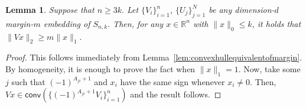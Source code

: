 \documentclass[preprint]{article}
\newtheorem{lemma}{Lemma}[]
\newcommand{\ksparsen}{S_{n,k}}
\newcommand{\conv}{\mathsf{conv}}
\begin{document}
\begin{lemma}\label{lem:reductiontosparselowerbound}
    Suppose that $n \ge 3k.$ Let $\{V_i\}_{i =1}^n$, $\{U_j\}_{j = 1}^N$ be any dimension-$d$ margin-$m$ embedding of $\ksparsen.$ Then, for any $x \in \mathbb{R}^n$ with $\|x\|_0 \leq k$, it holds that 
    $\|Vx\|_2 \geq m\|x\|_1.$
\end{lemma}
\begin{proof} This follows immediately from Lemma~\ref{lem:convexhullequivalentofmargin}. By homogeneity, it is enough to prove the fact when $\|x\|_1 = 1.$ Now, take some $j$ such that $(-1)^{A_{ji}+1}$ and $x_i$ have the same sign whenever $x_i\neq 0.$ Then, $Vx\in \conv(\{(-1)^{A_{ji}+1}V_i\}_{i = 1}^n)$ and the result follows.
\end{proof}
\end{document}
